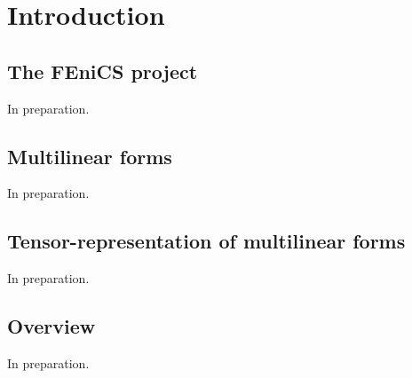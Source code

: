 \chapter{Introduction}
\label{sec:introduction}

\section{The FEniCS project}

In preparation.


\section{Multilinear forms}

In preparation.



\section{Tensor-representation of multilinear forms}

In preparation.

\section{Overview}

In preparation.
